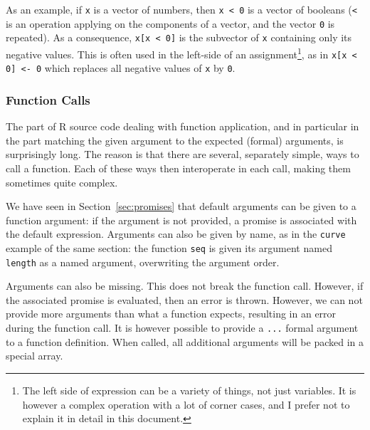 \documentclass{article}
\newcommand\R{R}
\begin{document}
As an example, if \texttt{x} is a vector of numbers,
then \texttt{x < 0} is a vector of booleans
(\texttt{<} is an operation applying on the components
of a vector, and the vector \texttt{0} is repeated).
As a consequence, \texttt{x[x < 0]} is the subvector of
\texttt{x} containing only its negative values.
This is often used in the left-side of an assignment\footnote{
    The left side of expression can be a variety of things,
    not just variables.
    It is however a complex operation with a lot of corner cases,
    and I prefer not to explain it in detail in this document.
}, as in \texttt{x[x < 0] <- 0} which replaces all
negative values of \texttt{x} by \texttt{0}.

\subsubsection{Function Calls}
\label{sec:function:calls}

The part of \R{} source code dealing with function application,
and in particular in the part matching the given argument to the
expected (formal) arguments, is surprisingly long.
The reason is that there are several, separately simple, ways to call
a function.
Each of these ways then interoperate in each call,
making them sometimes quite complex.

We have seen in Section~\ref{sec:promises} that default arguments can be given
to a function argument:
if the argument is not provided, a promise is associated with the default expression.
Arguments can also be given by name,
as in the \texttt{curve} example of the same section:
the function \texttt{seq} is given its argument named \texttt{length}
as a named argument,
overwriting the argument order.

Arguments can also be missing.
This does not break the function call.
However, if the associated promise is evaluated, then an error is thrown.
However, we can not provide more arguments than what a function expects,
resulting in an error during the function call.
It is however possible to provide a \texttt{...} formal argument
to a function definition.
When called, all additional arguments will be packed in a special array.
\end{document}
